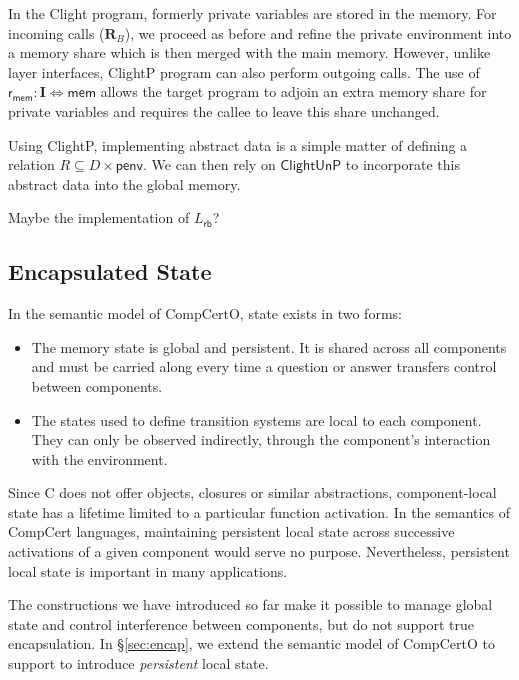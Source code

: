 \documentclass[acmsmall,screen,review,anonymous]{acmart}
\newcommand{\kw}[1]{\ensuremath{ \mathsf{#1} }}
\begin{document}
In the Clight program,
formerly private variables are stored in the memory.
For incoming calls ($\mathbf{R}_B$),
we proceed as before and refine the private environment
into a memory share which is then merged with the main memory.
However, unlike layer interfaces,
ClightP program can also perform outgoing calls.
The use of
$\kw{r}_\kw{mem} : \mathbf{I} \Leftrightarrow \kw{mem}$
allows the target program to adjoin an extra memory share
for private variables
and requires the callee to leave this share unchanged.

Using ClightP,
implementing abstract data is a simple matter of
defining a relation $R \subseteq D \times \kw{penv}$.
We can then rely on $\kw{ClightUnP}$
to incorporate this abstract data into the global memory.

\begin{example}
Maybe the implementation of $L_\kw{rb}$?
\end{example}


\subsection{Encapsulated State} %

In the semantic model of CompCertO, state exists in two forms:
\begin{itemize}
  \item The memory state is global and persistent.
    It is shared across all components
    and must be carried along
    every time a question or answer transfers control
    between components.
  \item The states used to define transition systems
    are local to each component.
    They can only be observed indirectly,
    through the component's interaction with the environment.
\end{itemize}
Since C does not offer objects, closures or similar abstractions,
component-local state has a lifetime limited to a particular function activation.
In the semantics of CompCert languages,
maintaining persistent local state
across successive activations of a given component
would serve no purpose.
Nevertheless,
persistent local state is important in many applications.

The constructions we have introduced so far
make it possible to manage global state
and control interference between components,
but do not support true encapsulation.
In \S\ref{sec:encap},
we extend the semantic model of CompCertO
to support to introduce \emph{persistent}
local state.
\end{document}
